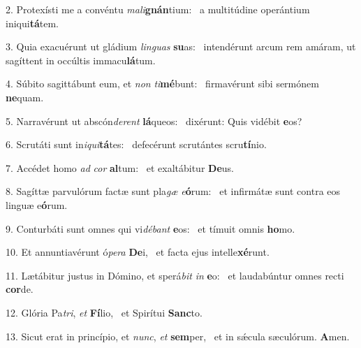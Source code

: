 2. Protexísti me a convéntu \textit{ma}\textit{li}\textbf{gnán}tium: \ast\  a multitúdine operántium iniqui\textbf{tá}tem.\

3. Quia exacuérunt ut gládium \textit{lin}\textit{guas} \textbf{su}as: \ast\  intendérunt arcum rem amáram, ut sagíttent in occúltis immacu\textbf{lá}tum.\

4. Súbito sagittábunt eum, et \textit{non} \textit{ti}\textbf{mé}bunt: \ast\  firmavérunt sibi sermónem \textbf{ne}quam.\

5. Narravérunt ut abscón\textit{de}\textit{rent} \textbf{lá}queos: \ast\  dixérunt: Quis vidébit \textbf{e}os?\

6. Scrutáti sunt in\textit{i}\textit{qui}\textbf{tá}tes: \ast\  defecérunt scrutántes scru\textbf{tí}nio.\

7. Accédet homo \textit{ad} \textit{cor} \textbf{al}tum: \ast\  et exaltábitur \textbf{De}us.\

8. Sagíttæ parvulórum factæ sunt pla\textit{gæ} \textit{e}\textbf{ó}rum: \ast\  et infirmátæ sunt contra eos linguæ e\textbf{ó}rum.\

9. Conturbáti sunt omnes qui vi\textit{dé}\textit{bant} \textbf{e}os: \ast\  et tímuit omnis \textbf{ho}mo.\

10. Et annuntiavérunt ó\textit{pe}\textit{ra} \textbf{De}i, \ast\  et facta ejus intelle\textbf{xé}runt.\

11. Lætábitur justus in Dómino, et sperá\textit{bit} \textit{in} \textbf{e}o: \ast\  et laudabúntur omnes recti \textbf{cor}de.\

12. Glória Pa\textit{tri}, \textit{et} \textbf{Fí}lio, \ast\  et Spirítui \textbf{Sanc}to.\

13. Sicut erat in princípio, et \textit{nunc}, \textit{et} \textbf{sem}per, \ast\  et in sǽcula sæculórum. \textbf{A}men.\

